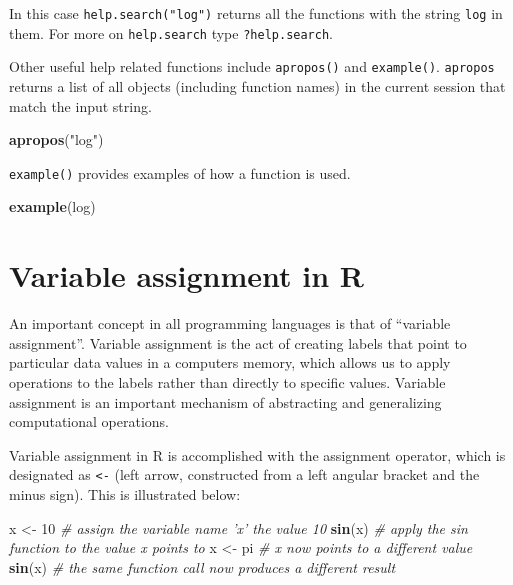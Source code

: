 \documentclass[]{book}
\newenvironment{Shaded}{\begin{snugshade}}{\end{snugshade}}
\newcommand{\CommentTok}[1]{\textcolor[rgb]{0.56,0.35,0.01}{\textit{#1}}}
\newcommand{\DecValTok}[1]{\textcolor[rgb]{0.00,0.00,0.81}{#1}}
\newcommand{\KeywordTok}[1]{\textcolor[rgb]{0.13,0.29,0.53}{\textbf{#1}}}
\newcommand{\NormalTok}[1]{#1}
\newcommand{\StringTok}[1]{\textcolor[rgb]{0.31,0.60,0.02}{#1}}
\theoremstyle{definition}
\theoremstyle{definition}
\theoremstyle{definition}
\theoremstyle{remark}
\begin{document}
In this case \texttt{help.search("log")} returns all the functions with
the string \texttt{log} in them. For more on \texttt{help.search} type
\texttt{?help.search}.

Other useful help related functions include \texttt{apropos()} and
\texttt{example()}. \texttt{apropos} returns a list of all objects
(including function names) in the current session that match the input
string.

\begin{Shaded}
\begin{Highlighting}[]
\KeywordTok{apropos}\NormalTok{(}\StringTok{"log"}\NormalTok{)}
\end{Highlighting}
\end{Shaded}

\texttt{example()} provides examples of how a function is used.

\begin{Shaded}
\begin{Highlighting}[]
\KeywordTok{example}\NormalTok{(log)}
\end{Highlighting}
\end{Shaded}

\hypertarget{variable-assignment-in-r}{%
\section{Variable assignment in R}\label{variable-assignment-in-r}}

An important concept in all programming languages is that of ``variable
assignment''. Variable assignment is the act of creating labels that
point to particular data values in a computers memory, which allows us
to apply operations to the labels rather than directly to specific
values. Variable assignment is an important mechanism of abstracting and
generalizing computational operations.

Variable assignment in R is accomplished with the assignment operator,
which is designated as \texttt{\textless{}-} (left arrow, constructed
from a left angular bracket and the minus sign). This is illustrated
below:

\begin{Shaded}
\begin{Highlighting}[]
\NormalTok{x <-}\StringTok{ }\DecValTok{10}  \CommentTok{# assign the variable name 'x' the value 10}
\KeywordTok{sin}\NormalTok{(x)   }\CommentTok{# apply the sin function to the value x points to}
\NormalTok{x <-}\StringTok{ }\NormalTok{pi  }\CommentTok{# x now points to a different value}
\KeywordTok{sin}\NormalTok{(x)   }\CommentTok{# the same function call now produces a different result }
\end{Highlighting}
\end{Shaded}
\end{document}

